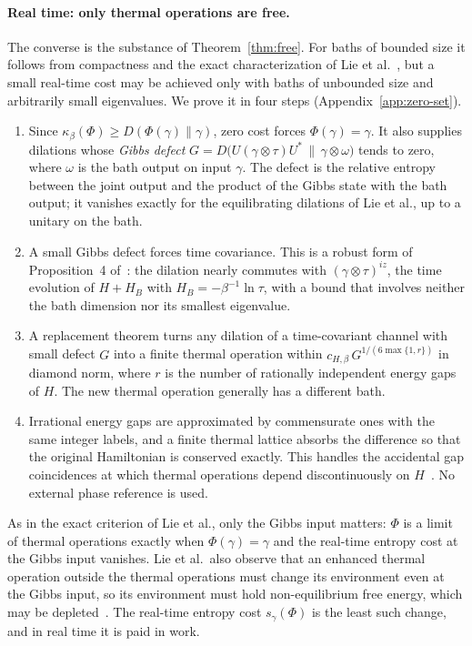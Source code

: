 \documentclass[11pt]{article}
\theoremstyle{definition}
\theoremstyle{remark}
\newcommand{\Trt}{\kappa_\beta}
\begin{document}
\paragraph{Real time: only thermal operations are free.} The converse is the substance of Theorem~\ref{thm:free}. For baths of bounded size it follows from compactness and the exact characterization of Lie et al.~\cite{LieEtAl26}, but a small real-time cost may be achieved only with baths of unbounded size and arbitrarily small eigenvalues. We prove it in four steps (Appendix~\ref{app:zero-set}).
\begin{enumerate}[label=(\roman*)]
\item Since $\Trt(\Phi)\ge D(\Phi(\gamma)\|\gamma)$, zero cost forces $\Phi(\gamma)=\gamma$. It also supplies dilations whose \emph{Gibbs defect} $G=D\bigl(U(\gamma\otimes\tau)U^*\,\big\|\,\gamma\otimes\omega\bigr)$ tends to zero, where $\omega$ is the bath output on input $\gamma$. The defect is the relative entropy between the joint output and the product of the Gibbs state with the bath output; it vanishes exactly for the equilibrating dilations of Lie et al., up to a unitary on the bath.
\item A small Gibbs defect forces time covariance. This is a robust form of Proposition~4 of~\cite{LieEtAl26}: the dilation nearly commutes with $(\gamma\otimes\tau)^{iz}$, the time evolution of $H+H_B$ with $H_B=-\beta^{-1}\ln\tau$, with a bound that involves neither the bath dimension nor its smallest eigenvalue.
\item A replacement theorem turns any dilation of a time-covariant channel with small defect $G$ into a finite thermal operation within $c_{H,\beta}\,G^{1/(6\max\{1,r\})}$ in diamond norm, where $r$ is the number of rationally independent energy gaps of $H$. The new thermal operation generally has a different bath.
\item Irrational energy gaps are approximated by commensurate ones with the same integer labels, and a finite thermal lattice absorbs the difference so that the original Hamiltonian is conserved exactly. This handles the accidental gap coincidences at which thermal operations depend discontinuously on $H$~\cite[Sec.~III]{vomEnde22}. No external phase reference is used.
\end{enumerate}
As in the exact criterion of Lie et al., only the Gibbs input matters: $\Phi$ is a limit of thermal operations exactly when $\Phi(\gamma)=\gamma$ and the real-time entropy cost at the Gibbs input vanishes. Lie et al.\ also observe that an enhanced thermal operation outside the thermal operations must change its environment even at the Gibbs input, so its environment must hold non-equilibrium free energy, which may be depleted~\cite{LieEtAl26}. The real-time entropy cost $s_\gamma(\Phi)$ is the least such change, and in real time it is paid in work.
\end{document}
